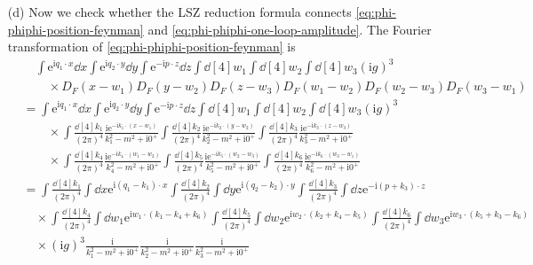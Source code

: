 \documentclass[hyperref, a4paper]{article}
\newcommand*{\ii}{\mathrm{i}}
\newcommand*{\ee}{\mathrm{e}}
\begin{document}
\begin{itemize}
    \item[(d)] Now we check whether the LSZ reduction formula connects \eqref{eq:phi-phiphi-position-feynman} and \eqref{eq:phi-phiphi-one-loop-amplitude}.
    The Fourier transformation of \eqref{eq:phi-phiphi-position-feynman} is 
    \[
        \begin{aligned}
            &\quad \int \ee^{\ii q_1 \cdot x} \dd{x} \int \ee^{\ii q_2 \cdot y} \dd{y} \int \ee^{- \ii p \cdot z} \dd{z} 
            \int \dd[4]{w_1} \int \dd[4]{w_2} \int \dd[4]{w_3} (\ii g)^3 \\
            &\quad \quad \times  D_F(x - w_1) D_F(y - w_2) D_F(z - w_3) D_F(w_1 - w_2) D_F(w_2 - w_3) D_F(w_3 - w_1) \\
            &= \int \ee^{\ii q_1 \cdot x} \dd{x} \int \ee^{\ii q_2 \cdot y} \dd{y} \int \ee^{- \ii p \cdot z} \dd{z} 
            \int \dd[4]{w_1} \int \dd[4]{w_2} \int \dd[4]{w_3} (\ii g)^3 \\
            &\quad \quad \times \int \frac{\dd[4]{k_1}}{(2\pi)^4} \frac{\ii  \ee^{- \ii k_1 \cdot (x - w_1)}}{k_1^2 - m^2 + \ii 0^+} 
            \int \frac{\dd[4]{k_2}}{(2\pi)^4} \frac{\ii  \ee^{- \ii k_2 \cdot (y - w_2)}}{k_2^2 - m^2 + \ii 0^+} 
            \int \frac{\dd[4]{k_3}}{(2\pi)^4} \frac{\ii  \ee^{- \ii k_3 \cdot (z - w_3)}}{k_3^2 - m^2 + \ii 0^+} \\
            &\quad \quad \times
            \int \frac{\dd[4]{k_4}}{(2\pi)^4} \frac{\ii  \ee^{- \ii k_4 \cdot (w_1 - w_2)}}{k_4^2 - m^2 + \ii 0^+}
            \int \frac{\dd[4]{k_5}}{(2\pi)^4} \frac{\ii  \ee^{- \ii k_5 \cdot (w_2 - w_3)}}{k_5^2 - m^2 + \ii 0^+}
            \int \frac{\dd[4]{k_6}}{(2\pi)^4} \frac{\ii  \ee^{- \ii k_6 \cdot (w_3 - w_1)}}{k_6^2 - m^2 + \ii 0^+} \\
            &= \int \frac{\dd[4]{k_1}}{(2\pi)^4} \int \dd{x} \ee^{\ii (q_1 - k_1) \cdot x}
            \int \frac{\dd[4]{k_2}}{(2\pi)^4} \int \dd{y} \ee^{\ii (q_2 - k_2) \cdot y} 
            \int \frac{\dd[4]{k_3}}{(2\pi)^4} \int \dd{z} \ee^{- \ii (p + k_3) \cdot z} \\
            &\quad  \times \int \frac{\dd[4]{k_4}}{(2\pi)^4} \int \dd{w_1} \ee^{\ii w_1 \cdot (k_1 - k_4 + k_6)} 
            \int \frac{\dd[4]{k_5}}{(2\pi)^4} \int \dd{w_2} \ee^{\ii w_2 \cdot (k_2 + k_4 - k_5)} 
            \int \frac{\dd[4]{k_6}}{(2\pi)^4} \int \dd{w_3} \ee^{\ii w_3 \cdot (k_5 + k_3 - k_6)} \\
            &\quad \times (\ii g)^3 \frac{\ii}{k_1^2 - m^2 + \ii 0^+} \frac{\ii}{k_2^2 - m^2 + \ii 0^+} \frac{\ii}{k_3^2 - m^2 + \ii 0^+}  \\

\end{aligned}\]
\end{itemize}
\end{document}
